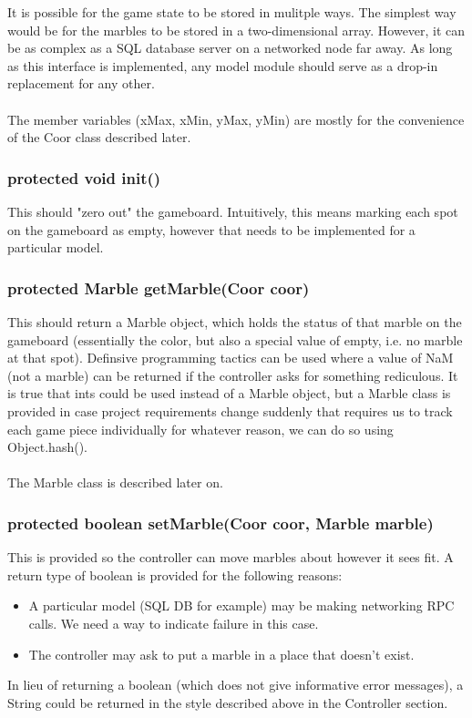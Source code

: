 \documentclass{article}
\begin{document}
It is possible for the game state to be stored in mulitple ways. The simplest way would be for the marbles to be stored in a two-dimensional array. However, it can be as complex as a SQL database server on a networked node far away. As long as this interface is implemented, any model module should serve as a drop-in replacement for any other.\\\\

The member variables (xMax, xMin, yMax, yMin) are mostly for the convenience of the Coor class described later.

\subsubsection*{protected void init()}
This should "zero out" the gameboard. Intuitively, this means marking each spot on the gameboard as empty, however that needs to be implemented for a particular model.

\subsubsection*{protected Marble getMarble(Coor coor)}
This should return a Marble object, which holds the status of that marble on the gameboard (essentially the color, but also a special value of empty, i.e. no marble at that spot). Definsive programming tactics can be used where a value of NaM (not a marble) can be returned if the controller asks for something rediculous. It is true that ints could be used instead of a Marble object, but a Marble class is provided in case project requirements change suddenly that requires us to track each game piece individually for whatever reason, we can do so using Object.hash().\\\\

The Marble class is described later on.

\subsubsection*{protected boolean setMarble(Coor coor, Marble marble)}
This is provided so the controller can move marbles about however it sees fit. A return type of boolean is provided for the following reasons:
\begin{itemize}
\item A particular model (SQL DB for example) may be making networking RPC calls. We need a way to indicate failure in this case.
\item The controller may ask to put a marble in a place that doesn't exist.
\end{itemize}
In lieu of returning a boolean (which does not give informative error messages), a String could be returned in the style described above in the Controller section.
\end{document}
